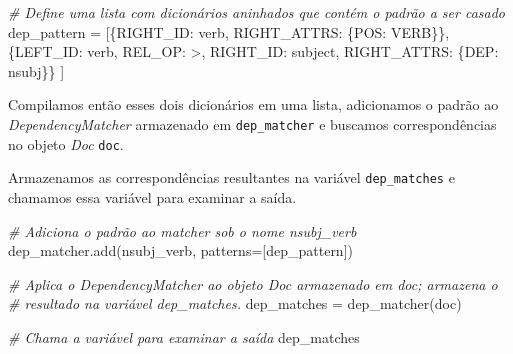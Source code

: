\documentclass[
  brazilian,
]{article}
\newenvironment{Shaded}{}{}
\newcommand{\CommentTok}[1]{\textcolor[rgb]{0.38,0.63,0.69}{\textit{#1}}}
\newcommand{\NormalTok}[1]{#1}
\newcommand{\OperatorTok}[1]{\textcolor[rgb]{0.40,0.40,0.40}{#1}}
\newcommand{\StringTok}[1]{\textcolor[rgb]{0.25,0.44,0.63}{#1}}
\begin{document}
\begin{Shaded}
\begin{Highlighting}[]
\CommentTok{\# Define uma lista com dicionários aninhados que contém o padrão a ser casado}
\NormalTok{dep\_pattern }\OperatorTok{=}\NormalTok{ [\{}\StringTok{\textquotesingle{}RIGHT\_ID\textquotesingle{}}\NormalTok{: }\StringTok{\textquotesingle{}verb\textquotesingle{}}\NormalTok{, }\StringTok{\textquotesingle{}RIGHT\_ATTRS\textquotesingle{}}\NormalTok{: \{}\StringTok{\textquotesingle{}POS\textquotesingle{}}\NormalTok{: }\StringTok{\textquotesingle{}VERB\textquotesingle{}}\NormalTok{\}\},}
\NormalTok{               \{}\StringTok{\textquotesingle{}LEFT\_ID\textquotesingle{}}\NormalTok{: }\StringTok{\textquotesingle{}verb\textquotesingle{}}\NormalTok{, }\StringTok{\textquotesingle{}REL\_OP\textquotesingle{}}\NormalTok{: }\StringTok{\textquotesingle{}\textgreater{}\textquotesingle{}}\NormalTok{, }\StringTok{\textquotesingle{}RIGHT\_ID\textquotesingle{}}\NormalTok{: }\StringTok{\textquotesingle{}subject\textquotesingle{}}\NormalTok{, }\StringTok{\textquotesingle{}RIGHT\_ATTRS\textquotesingle{}}\NormalTok{: \{}\StringTok{\textquotesingle{}DEP\textquotesingle{}}\NormalTok{: }\StringTok{\textquotesingle{}nsubj\textquotesingle{}}\NormalTok{\}\}}
\NormalTok{              ]}
\end{Highlighting}
\end{Shaded}

Compilamos então esses dois dicionários em uma lista, adicionamos o
padrão ao \emph{DependencyMatcher} armazenado em \texttt{dep\_matcher} e
buscamos correspondências no objeto \emph{Doc} \texttt{doc}.

Armazenamos as correspondências resultantes na variável
\texttt{dep\_matches} e chamamos essa variável para examinar a saída.

\begin{Shaded}
\begin{Highlighting}[]
\CommentTok{\# Adiciona o padrão ao matcher sob o nome \textquotesingle{}nsubj\_verb\textquotesingle{}}
\NormalTok{dep\_matcher.add(}\StringTok{\textquotesingle{}nsubj\_verb\textquotesingle{}}\NormalTok{, patterns}\OperatorTok{=}\NormalTok{[dep\_pattern])}

\CommentTok{\# Aplica o DependencyMatcher ao objeto Doc armazenado em \textquotesingle{}doc\textquotesingle{}; armazena o}
\CommentTok{\# resultado na variável \textquotesingle{}dep\_matches\textquotesingle{}.}
\NormalTok{dep\_matches }\OperatorTok{=}\NormalTok{ dep\_matcher(doc)}

\CommentTok{\# Chama a variável para examinar a saída}
\NormalTok{dep\_matches}
\end{Highlighting}
\end{Shaded}
\end{document}
